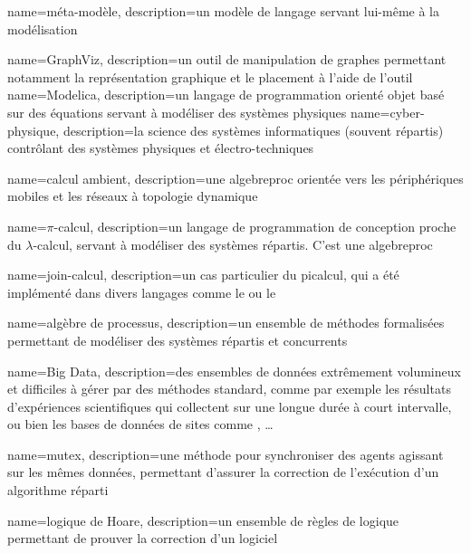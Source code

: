 {
	name={méta-modèle},
	description={un modèle de langage servant lui-même à la modélisation}	
}

{
	name=GraphViz, 
	description={un outil de manipulation de graphes permettant notamment la représentation graphique et le placement à l'aide de l'outil }
}
{
	name=Modelica, 
	description={un langage de programmation orienté objet basé sur des équations servant à modéliser des systèmes physiques}
}
{
	name=cyber-physique, 
	description={la science des systèmes informatiques (souvent répartis) contrôlant des systèmes physiques et électro-techniques}
}

{
	name={calcul ambient}, 
	description={une \gls{algebreproc} orientée vers les périphériques mobiles et les réseaux à topologie dynamique}
}

{
	name={$\pi$-calcul},
	description={un langage de programmation de conception proche du $\lambda$-calcul, servant à modéliser des systèmes répartis. C'est une \gls{algebreproc}}	
}

{
	name={join-calcul}, 
	description={un cas particulier du \gls{picalcul}, qui a été implémenté dans divers langages comme le  ou le }
}

{
	name={algèbre de processus},
	description={un ensemble de méthodes formalisées permettant de modéliser des systèmes répartis et concurrents}
}

{
	name={Big Data},
	description={des ensembles de données extrêmement volumineux et difficiles à gérer par des méthodes standard, comme par exemple les résultats d'expériences scientifiques qui collectent sur une longue durée à court intervalle, ou bien les bases de données de sites comme , \dots}
}

{
	name=mutex,
	description={une méthode pour synchroniser des agents agissant sur les mêmes données, permettant d'assurer la correction de l'exécution d'un algorithme réparti}	
}

{
	name={logique de Hoare},
	description={un ensemble de règles de logique permettant de prouver la correction d'un logiciel}
}